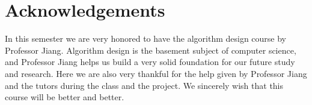 \documentclass{acmtog} %
\begin{document}
\section*{Acknowledgements}
In this semester we are very honored to have the algorithm design course by Professor Jiang. Algorithm design is the basement subject of computer science, and Professor Jiang helps us build a very solid foundation for our future study and research. Here we are also very thankful for the help given by Professor Jiang and the tutors during the class and the project. We sincerely wish that this course will be better and better.




\end{document}
